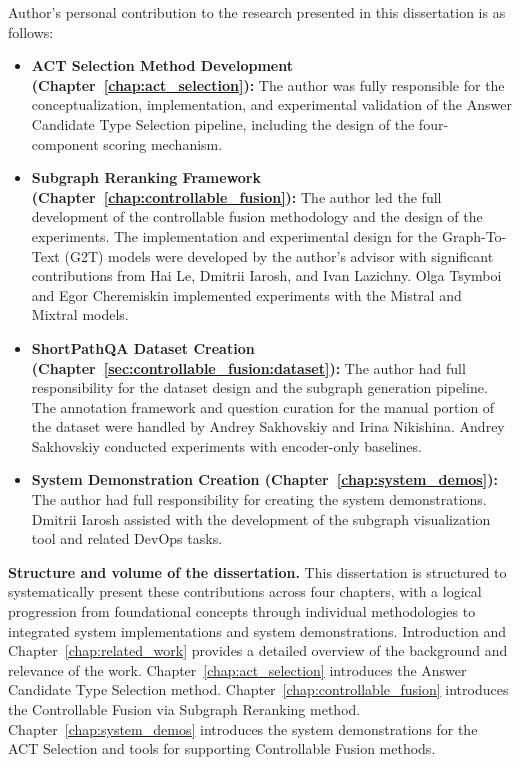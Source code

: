 Author's personal contribution to the research presented in this dissertation is as follows:
\begin{itemize}
    \item \textbf{ACT Selection Method Development (Chapter~\ref{chap:act_selection}):} The author was fully responsible for the conceptualization, implementation, and experimental validation of the Answer Candidate Type Selection pipeline, including the design of the four-component scoring mechanism.
    \item \textbf{Subgraph Reranking Framework (Chapter~\ref{chap:controllable_fusion}):} The author led the full development of the controllable fusion methodology and the design of the experiments. The implementation and experimental design for the Graph-To-Text (G2T) models were developed by the author's advisor with significant contributions from Hai Le, Dmitrii Iarosh, and Ivan Lazichny. Olga Tsymboi and Egor Cheremiskin implemented experiments with the Mistral and Mixtral models.
    \item \textbf{ShortPathQA Dataset Creation (Chapter~\ref{sec:controllable_fusion:dataset}):} The author had full responsibility for the dataset design and the subgraph generation pipeline. The annotation framework and question curation for the manual portion of the dataset were handled by Andrey Sakhovskiy and Irina Nikishina. Andrey Sakhovskiy conducted experiments with encoder-only baselines.
    \item \textbf{System Demonstration Creation (Chapter~\ref{chap:system_demos}):} The author had full responsibility for creating the system demonstrations. Dmitrii Iarosh assisted with the development of the subgraph visualization tool and related DevOps tasks.
\end{itemize}


\textbf{Structure and volume of the dissertation.}
This dissertation is structured to systematically present these contributions across four chapters, with a logical progression from foundational concepts through individual methodologies to integrated system implementations and system demonstrations. Introduction and Chapter~\ref{chap:related_work} provides a detailed overview of the background and relevance of the work. Chapter~\ref{chap:act_selection} introduces the Answer Candidate Type Selection method. Chapter~\ref{chap:controllable_fusion} introduces the Controllable Fusion via Subgraph Reranking method. Chapter~\ref{chap:system_demos} introduces the system demonstrations for the ACT Selection and tools for supporting Controllable Fusion methods.

